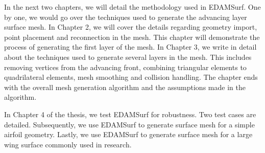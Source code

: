In the next two chapters, we will detail the methodology used in EDAMSurf. One by one, we would go over the techniques used to generate the advancing layer surface mesh. In Chapter 2, we will cover the details regarding geometry import, point placement and reconnection in the mesh. This chapter will demonstrate the process of generating the first layer of the mesh. In Chapter 3, we write in detail about the techniques used to generate several layers in the mesh. This includes removing vertices from the advancing front, combining triangular elements to quadrilateral elements, mesh smoothing and collision handling. The chapter ends with the overall mesh generation algorithm and the assumptions made in the algorithm.

In Chapter 4 of the thesis, we test EDAMSurf for robustness. Two test cases are detailed. Subsequently, we use EDAMSurf to generate surface mesh for a simple airfoil geometry. Lastly, we use EDAMSurf to generate surface mesh for a large wing surface commonly used in research. 

